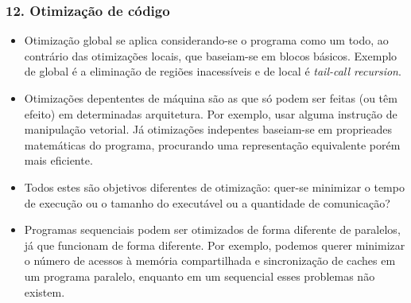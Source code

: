 \documentclass{beamer}
\begin{document}
\begin{frame}
  \frametitle{12. Otimiza\c c\~ao de c\'odigo}
  \begin{itemize}
  \item Otimiza\c c\~ao global se aplica considerando-se o programa
    como um todo, ao contr\'ario das otimiza\c c\~oes locais, que
    baseiam-se em blocos b\'asicos. Exemplo de global \'e a elimina\c
    c\~ao de regi\~oes inacess\'iveis e de local \'e \emph{tail-call
      recursion}.
  \item Otimiza\c c\~oes depententes de m\'aquina s\~ao as que s\'o
    podem ser feitas (ou t\^em efeito) em determinadas
    arquitetura. Por exemplo, usar alguma instru\c c\~ao de manipula\c
    c\~ao vetorial. J\'a otimiza\c c\~oes indepentes baseiam-se em
    proprieades matem\'aticas do programa, procurando uma representa\c
    c\~ao equivalente por\'em mais eficiente.
  \item Todos estes s\~ao objetivos diferentes de otimiza\c c\~ao:
    quer-se minimizar o tempo de execu\c c\~ao ou o tamanho do
    execut\'avel ou a quantidade de comunica\c c\~ao?
  \item Programas sequenciais podem ser otimizados de forma diferente
    de paralelos, j\'a que funcionam de forma diferente. Por exemplo,
    podemos querer minimizar o n\'umero de acessos \`a mem\'oria
    compartilhada e sincroniza\c c\~ao de caches em um programa
    paralelo, enquanto em um sequencial esses problemas n\~ao
    existem.
  \end{itemize}
\end{frame}
\end{document}
